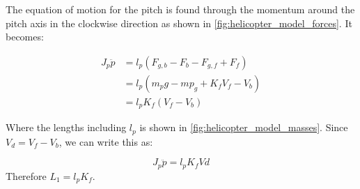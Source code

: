 The equation of motion for the pitch is found through the momentum
around the pitch axis in the clockwise direction as shown in
\cref{fig:helicopter_model_forces}. It becomes:

\begin{align*}
  J_p\ddot{p} &= l_p(F_{g,b} - F_b - F_{g,f} + F_f) \\
              &= l_p(m_pg - mp_g + K_fV_f - V_b) \\
              &= l_pK_f(V_f-V_b)
\end{align*}

Where the lengths including $l_p$ is shown in \cref{fig:helicopter_model_masses}. Since $V_d = V_f-V_b$, we can write this as:

\begin{equation}
\label{eq:pitch EoM}
  J_p\ddot{p} = l_pK_fVd
\end{equation}
Therefore $L_1 = l_pK_f$.

